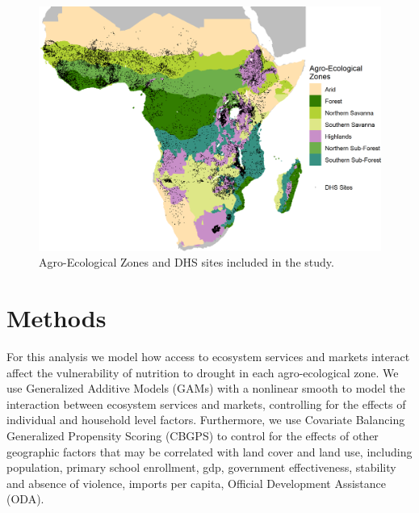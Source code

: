 \documentclass{article}
\begin{document}
\begin{figure}[h]
	\centering
	\includegraphics[width=0.8\linewidth]{AEZ_Sites.png}
	\caption{Agro-Ecological Zones and DHS sites included in the study.}
	\label{fig:AEZmap}
\end{figure}

\section{Methods}
For this analysis we model how access to ecosystem services and markets interact affect the vulnerability of nutrition to drought in each agro-ecological zone.  We use Generalized Additive Models (GAMs) with a nonlinear smooth to model the interaction between ecosystem services and markets, controlling for the effects of individual and household level factors.  Furthermore, we use Covariate Balancing Generalized Propensity Scoring (CBGPS) to control for the effects of other geographic factors that may be correlated with land cover and land use, including population, primary school enrollment, gdp, government effectiveness, stability and absence of violence, imports per capita, Official Development Assistance (ODA).
\end{document}

